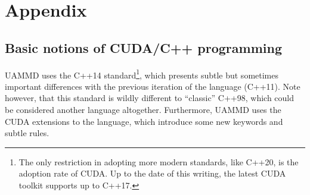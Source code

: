 \documentclass[twoside,openright,titlepage,numbers=noenddot,%
headinclude,footinclude,cleardoublepage=empty,abstract=on,
BCOR=5mm,fontsize=11pt, dvipsnames, paper=b5
]{scrreprt}
\newcommand{\uammd}{\gls{UAMMD}\xspace}
\begin{document}
%
%
%

\newpage
\cleardoublepage

\part{Appendix}

\appendix

\chapter{Basic notions of CUDA/C++ programming}\label{sec:cpp}

\uammd uses the C++14 standard\footnote{The only restriction in adopting more modern standards, like C++20, is the adoption rate of CUDA. Up to the date of this writing, the latest CUDA toolkit supports up to C++17.}, which presents subtle but sometimes important differences with the previous iteration of the language (C++11). Note however, that this standard is wildly different to ``classic'' C++98, which could be considered another language altogether. Furthermore, \uammd uses the CUDA extensions to the language, which introduce some new keywords and subtle rules.
\end{document}
